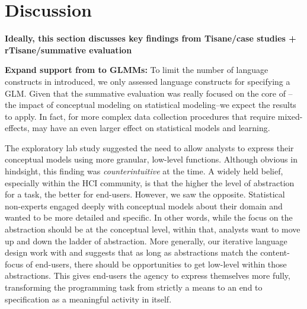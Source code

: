 \section{Discussion}
\textbf{Ideally, this section discusses key findings from Tisane/case studies + rTisane/summative evaluation}

\textbf{Expand support from \rTisane to GLMMs:} To limit the number of language constructs in \rTisane introduced, we only
assessed language constructs for specifying a GLM. Given that the summative
evaluation was really focused on the core of \rTisane--the impact of conceptual
modeling on statistical modeling--we expect the results to apply. In fact, for
more complex data collection procedures that require mixed-effects, \rTisane may
have an even larger effect on statistical models and learning. 


The exploratory lab study suggested the need to allow analysts to express their
conceptual models using more granular, low-level functions. Although obvious in
hindsight, this finding was \textit{counterintuitive} at the time. A widely held
belief, especially within the HCI community, is that the higher the level of
abstraction for a task, the better for end-users. However, we saw the opposite.
Statistical non-experts engaged deeply with conceptual models about their domain
and wanted to be more detailed and specific. In other words, while the focus on
the abstraction should be at the conceptual level, within that, analysts want to
move up and down the ladder of abstraction. More generally, our iterative
language design work with \tisane and \rTisane suggests that as long as
abstractions match the content-focus of end-users, there should be opportunities
to get low-level within those abstractions. This gives end-users the agency to
express themselves more fully, transforming the programming task from strictly a
means to an end to specification as a meaningful activity in itself. 


